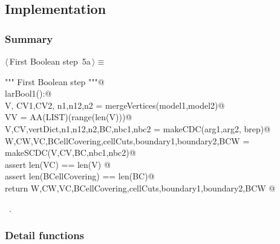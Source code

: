 \documentclass[11pt,oneside]{article}	%
\begin{document}
\subsection{Implementation}


\subsubsection{Summary}

\begin{flushleft} \small \label{scrap1}
\protect{}$\langle\,$First Boolean step\nobreak\ {\footnotesize 5a}$\,\rangle\equiv$
\vspace{-1ex}
\begin{list}{}{} \item
\mbox{}\verb@""" First Boolean step """@\\
\mbox{}\verb@def larBool1():@\\
\mbox{}\verb@   V, CV1,CV2, n1,n12,n2 = mergeVertices(model1,model2)@\\
\mbox{}\verb@   VV = AA(LIST)(range(len(V)))@\\
\mbox{}\verb@   V,CV,vertDict,n1,n12,n2,BC,nbc1,nbc2 = makeCDC(arg1,arg2, brep)@\\
\mbox{}\verb@   W,CW,VC,BCellCovering,cellCuts,boundary1,boundary2,BCW = makeSCDC(V,CV,BC,nbc1,nbc2)@\\
\mbox{}\verb@   assert len(VC) == len(V) @\\
\mbox{}\verb@   assert len(BCellCovering) == len(BC)@\\
\mbox{}\verb@   return W,CW,VC,BCellCovering,cellCuts,boundary1,boundary2,BCW @\\
\mbox{}\verb@@{\NWsep}
\end{list}
\vspace{-1ex}
\footnotesize\addtolength{\baselineskip}{-1ex}
\begin{list}{}{\setlength{\itemsep}{-\parsep}\setlength{\itemindent}{-\leftmargin}}
\item \NWtxtMacroRefIn\ .
\end{list}
\end{flushleft}

\subsubsection{Detail functions}
\end{document}
